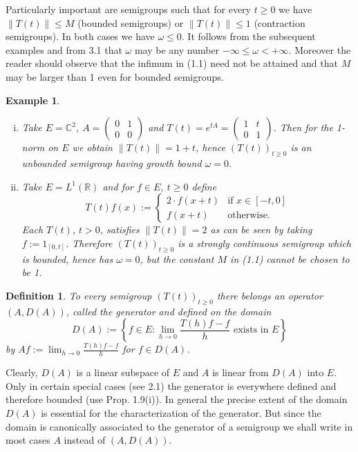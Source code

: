 \documentclass{article}
\newtheorem{definition}{Definition}
\newtheorem{example}{Example}
\begin{document}
Particularly important are semigroups such that for every $t \geq 0$ we have $\|T(t)\| \leq M$ (bounded semigroups) or $\|T(t)\| \leq 1$ (contraction semigroups).
In both cases we have $\omega \leq 0$.
It follows from the subsequent examples and from 3.1 that $\omega$ may be any number $-\infty \leq \omega < +\infty$.
Moreover the reader should observe that the infimum in (1.1) need not be attained and that $M$ may be larger than 1 even for bounded semigroups.

\begin{example}
\begin{enumerate}[(i)]
\item
Take $E = \mathbb{C}^2$, $A = \begin{pmatrix} 0 & 1 \\ 0 & 0 \end{pmatrix}$ and $T(t) = e^{tA} = \begin{pmatrix} 1 & t \\ 0 & 1 \end{pmatrix}$.
Then for the 1-norm on $E$ we obtain $\|T(t)\| = 1 + t$, hence $(T(t))_{t \geq 0}$ is an unbounded semigroup having growth bound $\omega = 0$.

\item
Take $E = L^1(\mathbb{R})$ and for $f \in E$, $t \geq 0$ define
\[
T(t)f(x) := \begin{cases}
2 \cdot f(x+t) & \text{if } x \in [-t,0] \\
f(x+t) & \text{otherwise.}
\end{cases}
\]
Each $T(t)$, $t > 0$, satisfies $\|T(t)\| = 2$ as can be seen by taking $f := 1_{[0,t]}$.
Therefore $(T(t))_{t \geq 0}$ is a strongly continuous semigroup which is bounded, hence has $\omega = 0$, but the constant $M$ in (1.1) cannot be chosen to be 1.

\end{enumerate}
\end{example}

\begin{definition}
To every semigroup $(T(t))_{t \geq 0}$ there belongs an operator $(A,D(A))$, called the generator and defined on the domain
\[
D(A) := \left\{f \in E: \lim_{h \to 0} \frac{T(h)f-f}{h} \text{ exists in } E\right\}
\]
by $Af := \lim_{h \to 0} \frac{T(h)f-f}{h}$ for $f \in D(A)$.
\end{definition}

Clearly, $D(A)$ is a linear subspace of $E$ and $A$ is linear from $D(A)$ into $E$.
Only in certain special cases (see 2.1) the generator is everywhere defined and therefore bounded (use Prop. 1.9(i)).
In general the precise extent of the domain $D(A)$ is essential for the characterization of the generator.
But since the domain is canonically associated to the generator of a semigroup we shall write in most cases $A$ instead of $(A,D(A))$.
\end{document}
